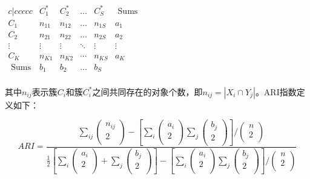 $\begin{matrix}{c|ccccc}
	&		C_{1}^{*}&		C_{2}^{*}&		\dots&		C_{S}^{*}&		\,\,\text{Sums}\\
	\hline
	C_1&		n_{11}&		n_{12}&		\dots&		n_{1S}&		a_1\\
	C_2&		n_{21}&		n_{22}&		\dots&		n_{2S}&		a_2\\
	\vdots&		\vdots&		\vdots&		\ddots&		\vdots&		\vdots\\
	C_K&		n_{K1}&		n_{K2}&		\cdots&		n_{KS}&		a_K\\
	\,\,\text{Sums}&		b_1&		b_2&		\dots&		b_S&		\\
\end{matrix}$

其中$n_{ij}$表示簇$C_{i}$和簇$C_{i}^{*}$之间共同存在的对象个数，即$n_{i j}=\left|X_{i} \cap Y_{j}\right|$。ARI指数定义如下：

\begin{equation}
\label{ARI}
ARI=\frac{\sum_{ij}{\left( \begin{array}{c}
	n_{ij}\\
	2\\
\end{array} \right)}-\left[ \sum_i{\left( \begin{array}{c}
	a_i\\
	2\\
\end{array} \right)}\sum_j{\left( \begin{array}{c}
	b_j\\
	2\\
\end{array} \right)} \right] /\left( \begin{array}{c}
	n\\
	2\\
\end{array} \right)}{\frac{1}{2}\left[ \sum_i{\left( \begin{array}{c}
	a_i\\
	2\\
\end{array} \right)}+\sum_j{\left( \begin{array}{c}
	b_j\\
	2\\
\end{array} \right)} \right] -\left[ \sum_i{\left( \begin{array}{c}
	a_i\\
	2\\
\end{array} \right)}\sum_j{\left( \begin{array}{c}
	b_j\\
	2\\
\end{array} \right)} \right] /\left( \begin{array}{c}
	n\\
	2\\
\end{array} \right)}
\end{equation}


